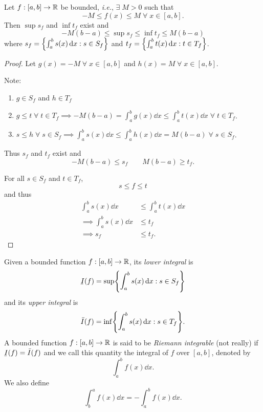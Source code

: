 \begin{lem}[]
    Let $f : [a, b] \to \mathbb{R}$ be bounded, \textit{i.e.}, $\exists\; M > 0$ such that \[
        -M \leq f(x) \leq M \;\forall\; x \in [a, b].
    \] Then $\sup s_{f}$ and $\inf t_{f}$ exist and \[
        -M (b - a) \leq \sup s_{f} \leq \inf t_{f} \leq M (b - a)
    \] where $s_{f} = \set{\int_{a}^{b}s(x) \dd x : s \in S_{f}}$ and $t_{f} = \set{\int_{a}^{b} t(x) \dd x : t \in T_{f}}$.
\end{lem}
\begin{proof}
    Let $g(x) = -M \;\forall\; x \in [a, b]$ and $h(x) = M \;\forall\; x \in [a, b]$.

    Note:
    \begin{enumerate}[label=(\alph*)]
        \item $g \in S_{f}$ and $h \in T_{f}$
        \item $g \leq t \;\forall\; t \in T_{f} \implies -M (b - a) = \int_{a}^{b} g(x) \dd x \leq \int_{a}^{b} t(x) \dd x \;\forall\; t \in T_{f}$.
        \item $s \leq h \;\forall\; s \in S_{f} \implies \int_{a}^{b} s(x) \dd x \leq \int_{a}^{b} h(x) \dd x = M (b - a) \;\forall\; s \in S_{f}$.
    \end{enumerate}
    Thus $s_{f}$ and $t_{f}$ exist and \[
        -M(b - a) \leq s_{f} \qquad M(b - a) \geq t_{f}.
    \]

    For all $s \in S_{f}$ and $t \in T_{f}$, \[
        s \leq f \leq t
    \] and thus
    \begin{align*}
        \int_{a}^{b} s(x) \dd x &\leq \int_{a}^{b} t(x) \dd x \\
        \implies \int_{a}^{b} s(x) \dd x &\leq t_{f} \\
        \implies s_{f} &\leq t_{f}.
    \end{align*}
\end{proof}

\begin{defn}[] \label{defn:integration:Riemann}
    Given a bounded function $f : [a, b] \to \mathbb{R}$, its \emph{lower integral} is \[
        \ubar{I}(f) = \sup \set{\int_{a}^{b} s(x) \dd x : s \in S_{f}}
    \] and its \emph{upper integral} is \[
        \bar{I}(f) = \inf \set{\int_{a}^{b} s(x) \dd x : s \in T_{f}}.
    \]
    A bounded function $f : [a, b] \to \mathbb{R}$ is said to be \emph{Riemann integrable} (not really) if $\ubar{I}(f) = \bar{I}(f)$ and we call this quantity the integral of $f$ over $[a, b]$, denoted by \[
        \int_{a}^{b} f(x) \dd x.
    \] We also define \[
        \int_{b}^{a} f(x) \dd x = -\int_{a}^{b} f(x) \dd x.
    \]
\end{defn}





